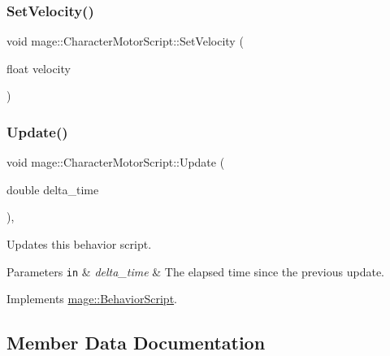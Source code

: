 \hypertarget{classmage_1_1_character_motor_script_a3e2290275845269c405533ce7b5c6c4c}{}\label{classmage_1_1_character_motor_script_a3e2290275845269c405533ce7b5c6c4c} 
\subsubsection{\texorpdfstring{Set\+Velocity()}{SetVelocity()}}
{\footnotesize\ttfamily void mage\+::\+Character\+Motor\+Script\+::\+Set\+Velocity (\begin{DoxyParamCaption}\item[{float}]{velocity }\end{DoxyParamCaption})\hspace{0.3cm}{\ttfamily [noexcept]}}

\hypertarget{classmage_1_1_character_motor_script_af09581e810c02ca4a19ecbaf0d7580bb}{}\label{classmage_1_1_character_motor_script_af09581e810c02ca4a19ecbaf0d7580bb} 
\subsubsection{\texorpdfstring{Update()}{Update()}}
{\footnotesize\ttfamily void mage\+::\+Character\+Motor\+Script\+::\+Update (\begin{DoxyParamCaption}\item[{double}]{delta\+\_\+time }\end{DoxyParamCaption})\hspace{0.3cm}{\ttfamily [override]}, {\ttfamily [virtual]}}

Updates this behavior script.


\begin{DoxyParams}[1]{Parameters}
\mbox{\tt in}  & {\em delta\+\_\+time} & The elapsed time since the previous update. \\
\hline
\end{DoxyParams}


Implements \hyperlink{classmage_1_1_behavior_script_a905b6c83640cb91d19fecab3435f6feb}{mage\+::\+Behavior\+Script}.



\subsection{Member Data Documentation}
\hypertarget{classmage_1_1_character_motor_script_ab73049127363ded0e6e8fb474b51794e}{}\label{classmage_1_1_character_motor_script_ab73049127363ded0e6e8fb474b51794e} 
